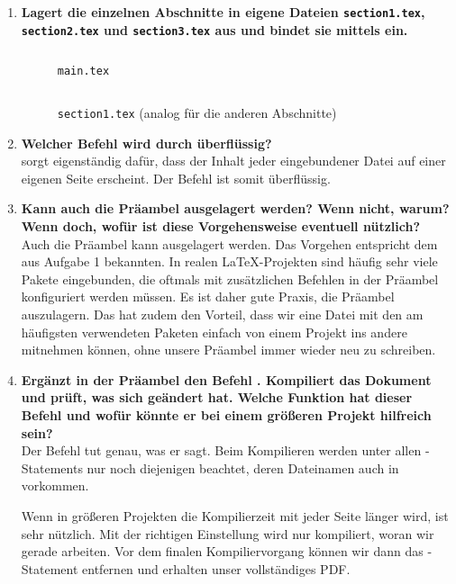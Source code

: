 \begin{enumerate}
  \item 
    \textbf{Lagert die einzelnen Abschnitte in eigene Dateien \texttt{section1.tex}, \texttt{section2.tex} und \texttt{section3.tex} aus und bindet sie mittels \texttt{} ein.}
    \begin{figure}[H]
      \inputminted[linenos=true]{latex}{exercises/project-structure/main-with-preamble.done.tex}
      \caption{\texttt{main.tex}}
    \end{figure}
    \begin{figure}[H]
      \inputminted[linenos=true,breaklines=true]{latex}{exercises/project-structure/section1.done.tex}
      \caption{\texttt{section1.tex} (analog für die anderen Abschnitte)}
    \end{figure}
  \item 
    \textbf{Welcher Befehl wird durch \texttt{} überflüssig?} \\
    \texttt{} sorgt eigenständig dafür, dass der Inhalt jeder eingebundener Datei auf einer eigenen Seite erscheint. Der Befehl \texttt{\newpage} ist somit überflüssig.
  \item 
    \textbf{Kann auch die Präambel ausgelagert werden? Wenn nicht, warum? Wenn doch, wofür ist diese Vorgehensweise eventuell nützlich?} \\
    Auch die Präambel kann ausgelagert werden. Das Vorgehen entspricht dem aus Aufgabe 1 bekannten. In realen \LaTeX-Projekten sind häufig sehr viele Pakete eingebunden, die oftmals mit zusätzlichen Befehlen in der Präambel konfiguriert werden müssen. Es ist daher gute Praxis, die Präambel auszulagern. Das hat zudem den Vorteil, dass wir eine Datei mit den am häufigsten verwendeten Paketen einfach von einem Projekt ins andere mitnehmen können, ohne unsere Präambel immer wieder neu zu schreiben.
  \item 
    \textbf{Ergänzt in der Präambel den Befehl \texttt{}. Kompiliert das Dokument und prüft, was sich geändert hat. Welche Funktion hat dieser Befehl und wofür könnte er bei einem größeren Projekt hilfreich sein? } \\
    Der Befehl \texttt{} tut genau, was er sagt. Beim Kompilieren werden unter allen \texttt{}-Statements nur noch diejenigen beachtet, deren Dateinamen auch in \texttt{} vorkommen.
    
    Wenn in größeren Projekten die Kompilierzeit mit jeder Seite länger wird, ist \texttt{} sehr nützlich. Mit der richtigen Einstellung wird nur kompiliert, woran wir gerade arbeiten. Vor dem finalen Kompiliervorgang können wir dann das \texttt{}-Statement entfernen und erhalten unser vollständiges PDF.
\end{enumerate}
